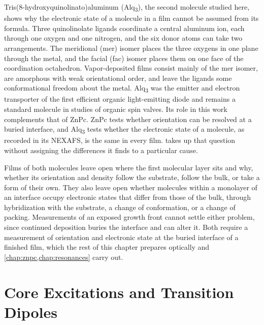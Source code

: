 Tris(8-hydroxyquinolinato)aluminum (Alq\textsubscript{3}), the second molecule studied here, shows why the electronic state of a molecule in a film cannot be assumed from its formula. Three quinolinolate ligands coordinate a central aluminum ion, each through one oxygen and one nitrogen, and the six donor atoms can take two arrangements. The meridional (mer) isomer places the three oxygens in one plane through the metal, and the facial (fac) isomer places them on one face of the coordination octahedron.\autocite{brinkmannCorrelationMolecularPacking2000,collePreparationCharacterizationBlueLuminescent2003} Vapor-deposited films consist mainly of the mer isomer, are amorphous with weak orientational order, and leave the ligands some conformational freedom about the metal. Alq\textsubscript{3} was the emitter and electron transporter of the first efficient organic light-emitting diode\autocite{tangOrganicElectroluminescentDiodes1987} and remains a standard molecule in studies of organic spin valves.\autocite{xiongGiantMagnetoresistanceOrganic2004,barraudUnravellingRoleInterface2010} Its role in this work complements that of ZnPc. ZnPc tests whether orientation can be resolved at a buried interface, and Alq\textsubscript{3} tests whether the electronic state of a molecule, as recorded in its NEXAFS, is the same in every film.  takes up that question without assigning the differences it finds to a particular cause.

Films of both molecules leave open where the first molecular layer sits and why, whether its orientation and density follow the substrate, follow the bulk, or take a form of their own. They also leave open whether molecules within a monolayer of an interface occupy electronic states that differ from those of the bulk, through hybridization with the substrate, a change of conformation, or a change of packing. Measurements of an exposed growth front cannot settle either problem, since continued deposition buries the interface and can alter it. Both require a measurement of orientation and electronic state at the buried interface of a finished film, which the rest of this chapter prepares optically and \cref{chap:znpc,chap:resonances} carry out.

\section{Core Excitations and Transition Dipoles}\label{sec:core-excitations-and-transition-dipoles}


